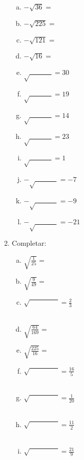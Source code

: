 \documentclass[a4paper,14pt]{article}
\begin{document}
\begin{multicols}{2}
\begin{enumerate}
\begin{enumerate}[a)]
        	\item $-\sqrt{36} = $
        	\item $-\sqrt{225} = $
        	\item $-\sqrt{121} = $
        	\item $-\sqrt{16} = $
        	\item $\sqrt{~~~~~~~~~~~~~~} = 30$
        	\item $\sqrt{~~~~~~~~~~~~~~} = 19$
        	\item $\sqrt{~~~~~~~~~~~~~~} = 14$
        	\item $\sqrt{~~~~~~~~~~~~~~} = 23$
        	\item $\sqrt{~~~~~~~~~~~~~~} = 1$
        	\item $-\sqrt{~~~~~~~~~~~~~~} = -7$
        	\item $-\sqrt{~~~~~~~~~~~~~~} = -9$
        	\item $-\sqrt{~~~~~~~~~~~~~~} = -21$
        \end{enumerate}
    	\item Completar:
    	\begin{enumerate}[a)]
    		\item $\sqrt{\frac{1}{25}} = $
    		\item $\sqrt{\frac{9}{49}} = $
    		\item $\sqrt{\phantom{6cm}~~~~~~~~~~} = \frac{2}{3}$
    		\\\\
    		\item $\sqrt{\frac{64}{169}} = $
    		\item $\sqrt{\frac{225}{16}} = $
    		\item $\sqrt{\phantom{6cm}~~~~~~~~~~} = \frac{16}{5}$
    		\\\\
    		\item $\sqrt{\phantom{6cm}~~~~~~~~~~} = \frac{1}{20}$
    		\\\\
    		\item $\sqrt{\phantom{6cm}~~~~~~~~~~} = \frac{11}{2}$
    		\\\\
    		\item $\sqrt{\phantom{6cm}~~~~~~~~~~} = \frac{21}{9}$
    		\\\\
    		
    	\end{enumerate}
		
		
    \end{enumerate}        
    \end{multicols}    
\end{document}
